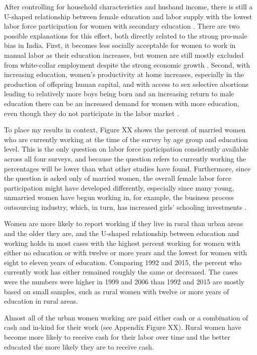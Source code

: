 After controlling for household characteristics and husband income, there is
still a U-shaped relationship between female education and labor supply with the
lowest labor force participation for women with secondary education \citep{Chatterjee2018}.
There are two possible explanations for this effect, both directly related to the strong
pro-male bias in India.
First, it becomes less socially acceptable for women to work in manual labor as their
education increases, but women are still mostly excluded from white-collar
employment despite the strong economic growth \citep{Klasen2015,Chatterjee2018}.
Second, with increasing education, women's productivity at home increases, especially
in the production of offspring human capital, and with access to sex selective abortions
leading to relatively more boys being born and an increasing return to male education 
there can be an increased demand for women with more education, even though they do not 
participate in the labor market \citep{Behrman1999}.


To place my results in context, Figure XX shows the percent of married women who are 
currently working at the time of the survey by age group and education level.
This is the only question on labor force participation consistently available 
across all four surveys, and because the question refers to currently working the 
percentages will be lower than what other studies have found.
Furthermore, since the question is asked only of married women, the overall female labor 
force participation might have developed differently, especially since many young, 
unmarried women have begun working in, for example, the business process 
outsourcing industry, which, in turn, has increased girls' schooling investments
\citep{Jensen2012}.

Women are more likely to report working if they live in rural than urban areas
and the older they are, and the U-shaped relationship between education and working
holds in most cases with the highest percent working for women with either no education
or with twelve or more years and the lowest for women with eight to eleven years 
of education.
Comparing 1992 and 2015, the percent who currently work has either remained roughly 
the same or decreased.
The cases were the numbers were higher in 1999 and 2006 than 1992 and 2015 are mostly
based on small samples, such as rural women with twelve or more years of education
in rural areas.

Almost all of the urban women working are paid either cash or a combination of
cash and in-kind for their work (see Appendix Figure XX).
Rural women have become more likely to receive cash for their labor over time and
the better educated the more likely they are to receive cash.

